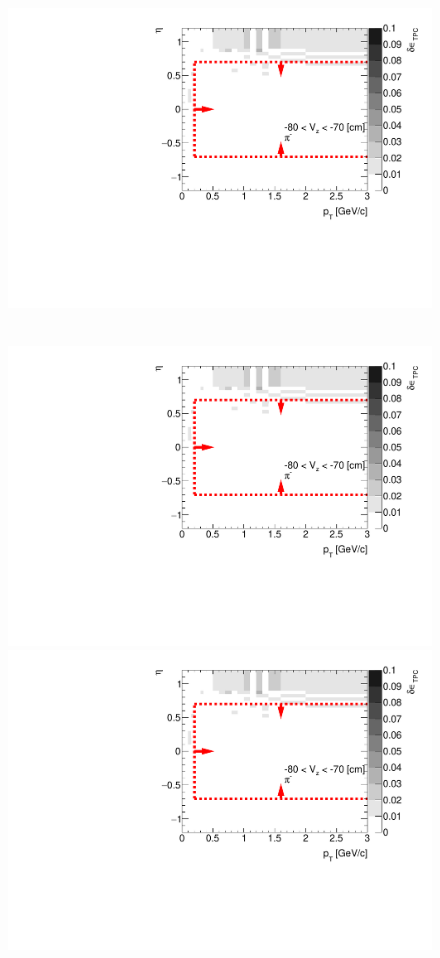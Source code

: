 \begin{figure}[hb]
{  \includegraphics[width=\linewidth,page=15]{graphics/systematicsEfficiency/deadMaterial/secondaries_Unbinned_SDCD_.pdf}\\
}~
\parbox{0.495\textwidth}{
  \centering
  \includegraphics[width=\linewidth,page=10]{graphics/systematicsEfficiency/deadMaterial/secondaries_Unbinned_SDCD_.pdf}\\
  \includegraphics[width=\linewidth,page=12]{graphics/systematicsEfficiency/deadMaterial/secondaries_Unbinned_SDCD_.pdf}\\
}
\end{figure}
